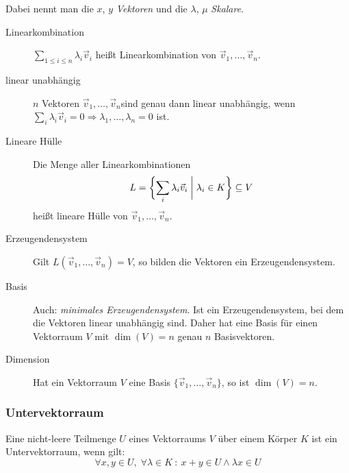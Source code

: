 Dabei nennt man die $x$, $y$ \emph{Vektoren} und die $\lambda$, $\mu$ \emph{Skalare}.
\begin{description}
  \item [Linearkombination]
        $\sum_{1 \leq i \leq n} \lambda_i \vec v_i$ heißt Linearkombination von $\vec v_1, \ldots, \vec v_n$.
  \item [linear unabhängig]
        $n$ Vektoren $\vec v_1, \ldots, \vec v_n$sind genau dann linear unabhängig, wenn $\sum_i \lambda_i \vec v_i = 0 \Rightarrow \lambda_1,\ldots,\lambda_n = 0$ ist.
  \item [Lineare Hülle]
	Die Menge aller Linearkombinationen
	\[ L=\biggl\{ \sum_i \lambda_i \vec v_i \biggm| \lambda_i \in K\biggr\} \subseteq V \]
	heißt lineare Hülle von $\vec{v}_{1},\ldots,\vec{v}_{n}$.
  \item [Erzeugendensystem]
	Gilt $L(\vec v_1,\ldots,\vec v_n)=V$, so bilden die Vektoren ein Erzeugendensystem.
  \item [Basis]
	Auch: \emph{minimales Erzeugendensystem}.
	Ist ein Erzeugendensystem, bei dem die Vektoren linear unabhängig sind.
	Daher hat eine Basis für einen Vektorraum $V$ mit $\dim(V)=n$ genau $n$ Basisvektoren.
  \item [Dimension]
	Hat ein Vektorraum $V$ eine Basis $\{ \vec v_1,\ldots,\vec v_n\}$, so ist $\dim(V)=n$.
\end{description}

\subsubsection{Untervektorraum}

Eine nicht-leere Teilmenge $U$ eines Vektorraums $V$ über einem Körper $K$ ist ein Untervektorraum, wenn gilt:
\[ \forall x,y\in U,\; \forall\lambda\in K\ :\ x+y\in U\land\lambda x\in U \]

